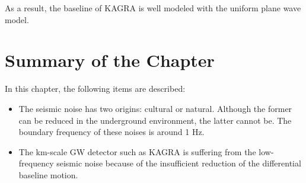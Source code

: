 As a result, the baseline of KAGRA is well modeled with the uniform plane wave model. 




\section{Summary of the Chapter}
In this chapter, the following items are described:
\begin{itemize}
\item The seismic noise has two origins: cultural or natural. Although the former can be reduced in the underground environment, the latter cannot be. The boundary frequency of these noises is around 1 Hz.
\item The km-scale GW detector such as KAGRA is suffering from the low-frequency seismic noise because of the insufficient reduction of the differential baseline motion.
\end{itemize}
